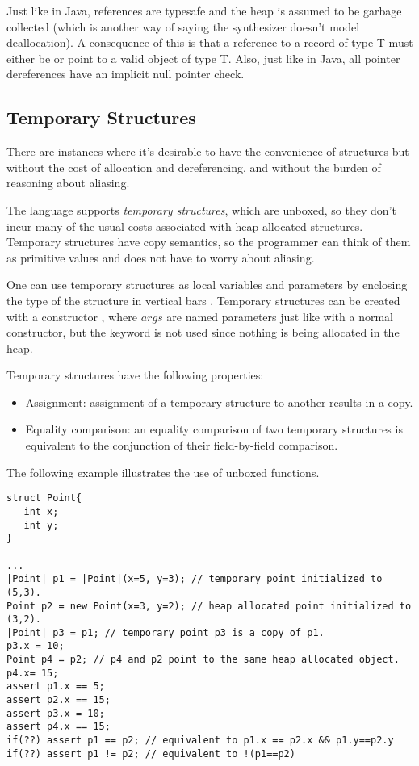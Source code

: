 Just like in Java, references are typesafe and the heap is assumed to be garbage collected (which is another way of saying the synthesizer doesn't model deallocation). A consequence of this is that a reference to a record of type T must either be  or point to a valid object of type T. Also, just like in Java, all pointer dereferences have an implicit null pointer check.

\subsection{Temporary Structures}

There are instances where it's desirable to have the convenience of structures but without the cost of allocation and dereferencing, and without the burden of reasoning about aliasing. 

The language supports \emph{temporary structures}, which are unboxed, so they don't incur many of the usual costs associated with heap allocated structures. Temporary structures have copy semantics, so the programmer can think of them as primitive values and does not have to worry about aliasing. 

One can use temporary structures as local variables and parameters by enclosing the type of the structure in vertical bars . Temporary structures can be created with a constructor , where $args$ are named parameters just like with a normal constructor, but the keyword  is not used since nothing is being allocated in the heap. 

Temporary structures have the following properties:
\begin{itemize}
\item Assignment: assignment of a temporary structure to another results in a copy. 
\item Equality comparison: an equality comparison of two temporary structures is equivalent to the conjunction of their field-by-field comparison.
\end{itemize}

The following example illustrates the use of unboxed functions.

\begin{Example}
\begin{lstlisting}
struct Point{
   int x;
   int y;
}

...
|Point| p1 = |Point|(x=5, y=3); // temporary point initialized to (5,3).
Point p2 = new Point(x=3, y=2); // heap allocated point initialized to (3,2).
|Point| p3 = p1; // temporary point p3 is a copy of p1.
p3.x = 10;
Point p4 = p2; // p4 and p2 point to the same heap allocated object.
p4.x= 15;
assert p1.x == 5;
assert p2.x == 15;
assert p3.x = 10;
assert p4.x == 15;
if(??) assert p1 == p2; // equivalent to p1.x == p2.x && p1.y==p2.y
if(??) assert p1 != p2; // equivalent to !(p1==p2)
\end{lstlisting}
\end{Example}

